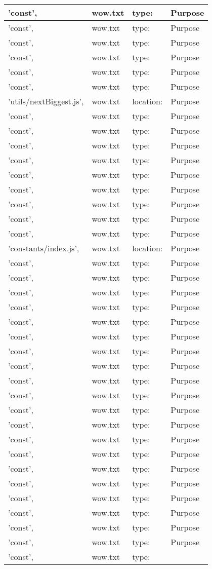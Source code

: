 \begin{table}[]
\begin{tabular}{|l|l|l|l|}
\hline 'const', & wow.txt & type: & Purpose \\ \hline 'const', & wow.txt & type: & Purpose \\ \hline 'const', & wow.txt & type: & Purpose \\ \hline 'const', & wow.txt & type: & Purpose \\ \hline 'const', & wow.txt & type: & Purpose \\ \hline 'const', & wow.txt & type: & Purpose \\ \hline 'utils/nextBiggest.js', & wow.txt & location: & Purpose \\ \hline 'const', & wow.txt & type: & Purpose \\ \hline 'const', & wow.txt & type: & Purpose \\ \hline 'const', & wow.txt & type: & Purpose \\ \hline 'const', & wow.txt & type: & Purpose \\ \hline 'const', & wow.txt & type: & Purpose \\ \hline 'const', & wow.txt & type: & Purpose \\ \hline 'const', & wow.txt & type: & Purpose \\ \hline 'const', & wow.txt & type: & Purpose \\ \hline 'const', & wow.txt & type: & Purpose \\ \hline 'constants/index.js', & wow.txt & location: & Purpose \\ \hline 'const', & wow.txt & type: & Purpose \\ \hline 'const', & wow.txt & type: & Purpose \\ \hline 'const', & wow.txt & type: & Purpose \\ \hline 'const', & wow.txt & type: & Purpose \\ \hline 'const', & wow.txt & type: & Purpose \\ \hline 'const', & wow.txt & type: & Purpose \\ \hline 'const', & wow.txt & type: & Purpose \\ \hline 'const', & wow.txt & type: & Purpose \\ \hline 'const', & wow.txt & type: & Purpose \\ \hline 'const', & wow.txt & type: & Purpose \\ \hline 'const', & wow.txt & type: & Purpose \\ \hline 'const', & wow.txt & type: & Purpose \\ \hline 'const', & wow.txt & type: & Purpose \\ \hline 'const', & wow.txt & type: & Purpose \\ \hline 'const', & wow.txt & type: & Purpose \\ \hline 'const', & wow.txt & type: & Purpose \\ \hline 'const', & wow.txt & type: & Purpose \\ \hline 'const', & wow.txt & type: & Purpose \\ \hline 'const', & wow.txt & type: & Purpose \\ \hline 'const', & wow.txt & type: & Purpose \\ \hline 'const', & wow.txt & type: & 
\end{tabular}
\end{table}
